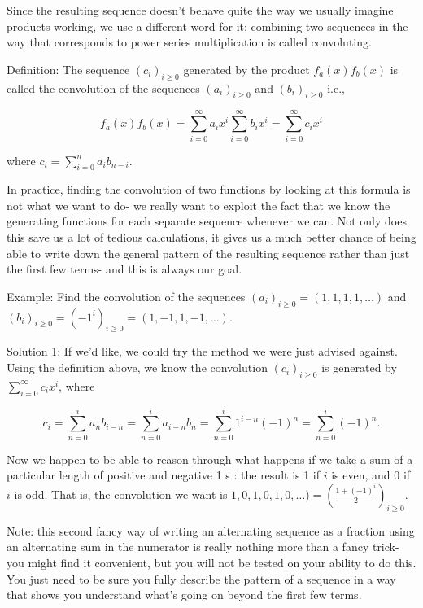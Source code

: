 \documentclass{article}
\begin{document}
Since the resulting sequence doesn't behave quite the way we usually imagine products working, we use a different word for it: combining two sequences in the way that corresponds to power series multiplication is called convoluting.

Definition: The sequence $\left(c_{i}\right)_{i \geq 0}$ generated by the product $f_{a}(x) f_{b}(x)$ is called the convolution of the sequences $\left(a_{i}\right)_{i \geq 0}$ and $\left(b_{i}\right)_{i \geq 0}$ i.e.,

$$
f_{a}(x) f_{b}(x)=\sum_{i=0}^{\infty} a_{i} x^{i} \sum_{i=0}^{\infty} b_{i} x^{i}=\sum_{i=0}^{\infty} c_{i} x^{i}
$$

where $c_{i}=\sum_{i=0}^{n} a_{i} b_{n-i}$.

In practice, finding the convolution of two functions by looking at this formula is not what we want to do- we really want to exploit the fact that we know the generating functions for each separate sequence whenever we can. Not only does this save us a lot of tedious calculations, it gives us a much better chance of being able to write down the general pattern of the resulting sequence rather than just the first few terms- and this is always our goal.

Example: Find the convolution of the sequences $\left(a_{i}\right)_{i \geq 0}=(1,1,1,1, \ldots)$ and $\left(b_{i}\right)_{i \geq 0}=\left(-1^{i}\right)_{i \geq 0}=(1,-1,1,-1, \ldots)$.

Solution 1: If we'd like, we could try the method we were just advised against. Using the definition above, we know the convolution $\left(c_{i}\right)_{i \geq 0}$ is generated by $\sum_{i=0}^{\infty} c_{i} x^{i}$, where

$$
c_{i}=\sum_{n=0}^{i} a_{n} b_{i-n}=\sum_{n=0}^{i} a_{i-n} b_{n}=\sum_{n=0}^{i} 1^{i-n}(-1)^{n}=\sum_{n=0}^{i}(-1)^{n} .
$$

Now we happen to be able to reason through what happens if we take a sum of a particular length of positive and negative 1 s : the result is 1 if $i$ is even, and 0 if $i$ is odd. That is, the convolution we want is $1,0,1,0,1,0, \ldots)=\left(\frac{1+(-1)^{i}}{2}\right)_{i \geq 0}$.

Note: this second fancy way of writing an alternating sequence as a fraction using an alternating sum in the numerator is really nothing more than a fancy trick- you might find it convenient, but you will not be tested on your ability to do this. You just need to be sure you fully describe the pattern of a sequence in a way that shows you understand what's going on beyond the first few terms.
\end{document}
